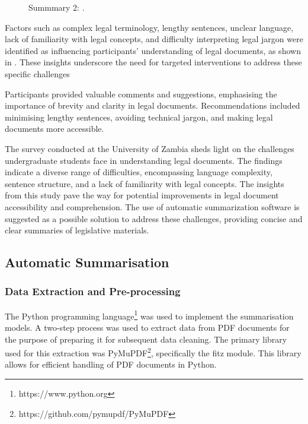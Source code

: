 \documentclass[conference]{IEEEtran}
\begin{document}
\begin{figure}%
%
\caption{Summmary 2: .}
\label{fig:results_and_discussion:challenges:understanding}
\end{figure}

Factors such as complex legal terminology, lengthy sentences, unclear language, lack of
familiarity with legal concepts, and difficulty interpreting legal jargon were identified as
influencing participants' understanding of legal documents, as shown in . These insights underscore the
need for targeted interventions to address these specific challenges

Participants provided valuable comments and suggestions, emphasising the importance of
brevity and clarity in legal documents. Recommendations included minimising lengthy
sentences, avoiding technical jargon, and making legal documents more accessible.

The survey conducted at the University of Zambia sheds light on the challenges
undergraduate students face in understanding legal documents. The findings indicate a
diverse range of difficulties, encompassing language complexity, sentence structure, and a
lack of familiarity with legal concepts. The insights from this study pave the way for potential
improvements in legal document accessibility and comprehension. The use of automatic
summarization software is suggested as a possible solution to address these challenges,
providing concise and clear summaries of legislative materials.

\subsection{Automatic Summarisation}
\label{sec:results_and_discussion:automatic_summarisation}

\subsubsection{Data Extraction and Pre-processing}
\label{sec:results_and_discussion:automatic_summarisation:data_extraction}
The Python programming language\footnote{https://www.python.org} was used to implement the summarisation models. A two-step process was used to extract data from PDF documents for the purpose of preparing it for subsequent data cleaning. The primary library used for this extraction was PyMuPDF\footnote{https://github.com/pymupdf/PyMuPDF}, specifically the fitz module. This library allows for efficient handling of PDF documents in Python.
\end{document}
